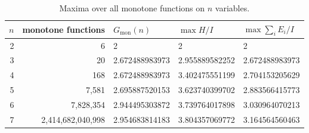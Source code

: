 \documentclass[11pt]{amsart}
\theoremstyle{remark}
\begin{document}
\begin{table}[tbp]
\centering
\begin{tabular}{rrlll}
\toprule
$n$ & monotone functions & $G_{\mathrm{mon}}(n)$ & $\max H/I$ & $\max\sum_iE_i/I$\\\midrule
2 & 6 & 2 & 2 & 2\\
3 & 20 & 2.672488983973 & 2.955889582252 & 2.672488983973\\
4 & 168 & 2.672488983973 & 3.402475551199 & 2.704153205629\\
5 & 7{,}581 & 2.695887520153 & 3.623740399702 & 2.883566415773\\
6 & 7{,}828{,}354 & 2.944495303872 & 3.739764017898 & 3.030964070213\\
7 & 2{,}414{,}682{,}040{,}998 & 2.954683814183 & 3.804357069772 & 3.164564560463\\
\bottomrule
\end{tabular}
\caption{Maxima over all monotone functions on $n$ variables.}\label{tab:census}
\end{table}
\end{document}
